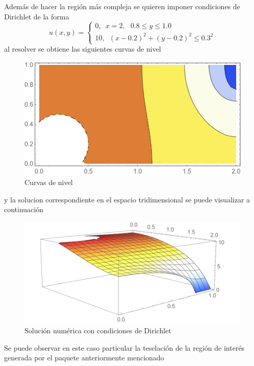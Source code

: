 \documentclass[a4paper]{article}
\begin{document}
Además de hacer la región más compleja se quieren imponer condiciones de Dirichlet de la forma
\begin{equation}
u(x,y)=
\begin{cases}
0, \,\,\, x=2,\,\,\,\,0.8\leq y \leq 1.0\\
10, \,\,\, (x-0.2)^2+(y-0.2)^2\leq 0.3^2
\end{cases}
\end{equation}
al resolver se obtiene las siguientes curvas de nivel
\begin{figure}[H]
\begin{center}
\includegraphics[scale=0.42]{./elliptic_omega_contour.png} 
\end{center} 
\caption{Curvas de nivel}
\label{fig::fig3}
\end{figure}
y la solucion correspondiente en el espacio tridimensional se puede visualizar a continuación
\begin{figure}[h]
\begin{center}
\includegraphics[scale=0.42]{./elliptic_omega_3D.png} 
\end{center} 
\caption{Solución numérica con condiciones de Dirichlet}
\label{fig::fig3}
\end{figure}
Se puede observar en este caso particular la teselación de la región de interés generada por el paquete anteriormente mencionado
\end{document}
